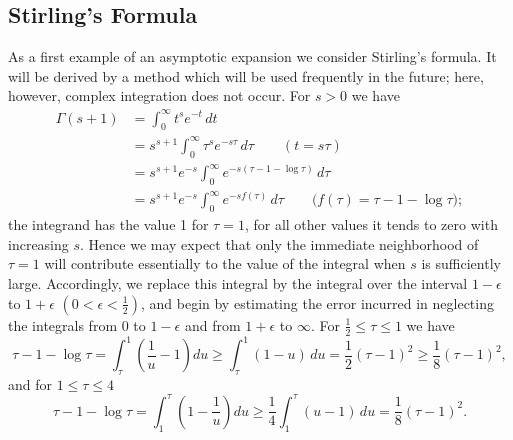 \subsection{Stirling's Formula}
As a first example of an asymptotic expansion we consider Stirling's formula. It will be derived by a method which will be used frequently in the future; here, however, complex integration does not occur. For $s>0$ we have
\begin{align*}
\Gamma(s+1)
&=\int_0^\infty t^se^{-t}\,dt\\
&=s^{s+1}\int_0^\infty \tau^se^{-s\tau}\,d\tau\qquad(t=s\tau)\\
&=s^{s+1}e^{-s}\int_0^\infty e^{-s(\tau-1-\log\tau)}\,d\tau\\
&=s^{s+1}e^{-s}\int_0^\infty e^{-sf(\tau)}\,d\tau
\qquad\bigl(f(\tau)=\tau-1-\log\tau\bigr);
\end{align*}
the integrand has the value 1 for $\tau=1$, for all other values it tends to zero with increasing $s$. Hence we may expect that only the immediate neighborhood of $\tau=1$ will contribute essentially to the value of the integral when $s$ is sufficiently large. Accordingly, we replace this integral by the integral over the interval $1-\epsilon$ to $1+\epsilon$ $(0<\epsilon<\tfrac12)$, and begin by estimating the error incurred in neglecting the integrals from 0 to $1-\epsilon$ and from $1+\epsilon$ to $\infty$. For $\tfrac12\le\tau\le1$ we have
\[
\tau-1-\log\tau
=\int_\tau^1\left(\frac1u-1\right)du
\ge\int_\tau^1(1-u)\,du
=\frac12(\tau-1)^2\ge\frac18(\tau-1)^2,
\]
and for $1\le\tau\le4$
\[
\tau-1-\log\tau
=\int_1^\tau\left(1-\frac1u\right)du
\ge\frac14\int_1^\tau(u-1)\,du
=\frac18(\tau-1)^2.
\]

